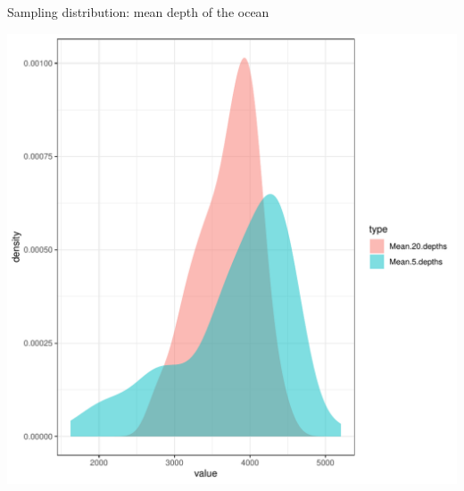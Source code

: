 \documentclass[10pt]{beamer}\usepackage[]{graphicx}\usepackage[]{color}
\makeatletter
\def\maxwidth{ %
  \ifdim\Gin@nat@width>\linewidth
    \linewidth
  \else
    \Gin@nat@width
  \fi
}
\newenvironment{knitrout}{}{} %
\makeatother
\begin{document}
\begin{frame}[fragile]{Sampling distribution: mean depth of the ocean}
	
	
\begin{knitrout}\tiny
{}\color{fgcolor}

{\centering \includegraphics[width=\maxwidth]{figure/unnamed-chunk-6-1} 

}



\end{knitrout}
	
\end{frame}















\end{document}
